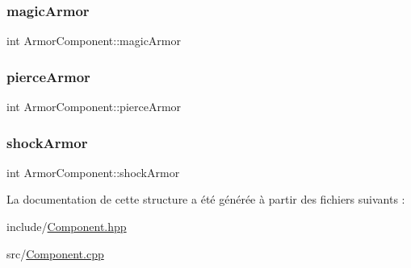 \subsubsection{\texorpdfstring{magic\+Armor}{magicArmor}}
{\footnotesize\ttfamily int Armor\+Component\+::magic\+Armor}

\mbox{\label{structArmorComponent_ac039e03a0e2377aff82d95c317777ec7}} 
\subsubsection{\texorpdfstring{pierce\+Armor}{pierceArmor}}
{\footnotesize\ttfamily int Armor\+Component\+::pierce\+Armor}

\mbox{\label{structArmorComponent_a2ece22c73ce63988ea38644fb1d856c5}} 
\subsubsection{\texorpdfstring{shock\+Armor}{shockArmor}}
{\footnotesize\ttfamily int Armor\+Component\+::shock\+Armor}



La documentation de cette structure a été générée à partir des fichiers suivants \+:\begin{DoxyCompactItemize}
\item 
include/\hyperlink{Component_8hpp}{Component.\+hpp}\item 
src/\hyperlink{Component_8cpp}{Component.\+cpp}\end{DoxyCompactItemize}

